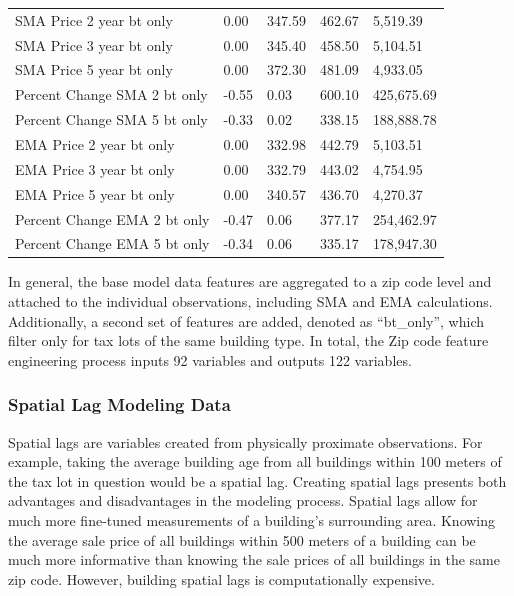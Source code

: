\documentclass[12pt,]{article}
\begin{document}
\begin{table}
{\begin{tabular}[t]{lllll}
\addlinespace
SMA Price 2 year bt only & 0.00 & 347.59 & 462.67 & 5,519.39\\
SMA Price 3 year bt only & 0.00 & 345.40 & 458.50 & 5,104.51\\
SMA Price 5 year bt only & 0.00 & 372.30 & 481.09 & 4,933.05\\
Percent Change SMA 2 bt only & -0.55 & 0.03 & 600.10 & 425,675.69\\
Percent Change SMA 5 bt only & -0.33 & 0.02 & 338.15 & 188,888.78\\
\addlinespace
EMA Price 2 year bt only & 0.00 & 332.98 & 442.79 & 5,103.51\\
EMA Price 3 year bt only & 0.00 & 332.79 & 443.02 & 4,754.95\\
EMA Price 5 year bt only & 0.00 & 340.57 & 436.70 & 4,270.37\\
Percent Change EMA 2 bt only & -0.47 & 0.06 & 377.17 & 254,462.97\\
Percent Change EMA 5 bt only & -0.34 & 0.06 & 335.17 & 178,947.30\\
\bottomrule
\end{tabular}}
\end{table}

In general, the base model data features are aggregated to a zip code
level and attached to the individual observations, including SMA and EMA
calculations. Additionally, a second set of features are added, denoted
as ``bt\_only'', which filter only for tax lots of the same building
type. In total, the Zip code feature engineering process inputs 92
variables and outputs 122 variables.

\hypertarget{spatial-lag-modeling-data}{%
\subsubsection{Spatial Lag Modeling
Data}\label{spatial-lag-modeling-data}}

Spatial lags are variables created from physically proximate
observations. For example, taking the average building age from all
buildings within 100 meters of the tax lot in question would be a
spatial lag. Creating spatial lags presents both advantages and
disadvantages in the modeling process. Spatial lags allow for much more
fine-tuned measurements of a building's surrounding area. Knowing the
average sale price of all buildings within 500 meters of a building can
be much more informative than knowing the sale prices of all buildings
in the same zip code. However, building spatial lags is computationally
expensive.
\end{document}
